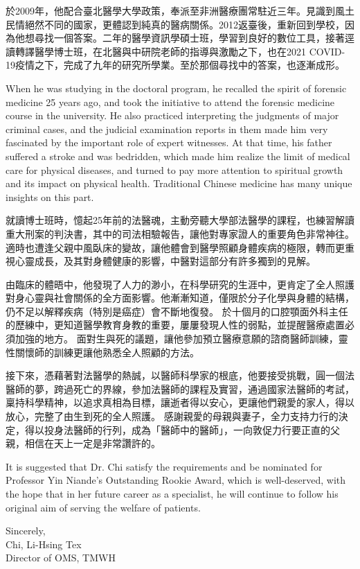 \documentclass{letter}
\begin{document}
\begin{letter}
於2009年，他配合臺北醫學大學政策，奉派至非洲醫療團常駐近三年。見識到風土民情絕然不同的國家，更體認到純真的醫病關係。2012返臺後，重新回到學校，因為他想尋找一個答案。二年的醫學資訊學碩士班，學習到良好的數位工具，接著逕讀轉譯醫學博士班，在北醫與中研院老師的指導與激勵之下，也在2021 COVID-19疫情之下，完成了九年的研究所學業。至於那個尋找中的答案，也逐漸成形。

When he was studying in the doctoral program, he recalled the spirit of forensic medicine 25 years ago, and took the initiative to attend the forensic medicine course in the university.
He also practiced interpreting the judgments of major criminal cases, and the judicial examination reports in them made him very fascinated by the important role of expert witnesses.
At that time, his father suffered a stroke and was bedridden, which made him realize the limit of medical care for physical diseases, and turned to pay more attention to spiritual growth and its impact on physical health. Traditional Chinese medicine has many unique insights on this part.

就讀博士班時，憶起25年前的法醫魂，主動旁聽大學部法醫學的課程，也練習解讀重大刑案的判決書，其中的司法相驗報告，讓他對專家證人的重要角色非常神往。
適時也遭逢父親中風臥床的變故，讓他體會到醫學照顧身體疾病的極限，轉而更重視心靈成長，及其對身體健康的影響，中醫對這部分有許多獨到的見解。

由臨床的體晤中，他發現了人力的渺小，在科學研究的生涯中，更肯定了全人照護對身心靈與社會關係的全方面影響。他漸漸知道，僅限於分子化學與身體的結構，仍不足以解釋疾病（特別是癌症）會不斷地復發。
於十個月的口腔顎面外科主任的歷練中，更知道醫學教育身教的重要，屢屢發現人性的弱點，並提醒醫療處置必須加強的地方。 %
面對生與死的議題，讓他參加預立醫療意願的諮商醫師訓練，靈性關懷師的訓練更讓他熟悉全人照顧的方法。

接下來，憑藉著對法醫學的熱誠，以醫師科學家的根底，他要接受挑戰，圓一個法醫師的夢，跨過死亡的界線，參加法醫師的課程及實習，通過國家法醫師的考試，稟持科學精神，以追求真相為目標，讓逝者得以安心，更讓他們親愛的家人，得以放心，完整了由生到死的全人照護。
感謝親愛的母親與妻子，全力支持力行的決定，得以投身法醫師的行列，成為「醫師中的醫師」，一向敦促力行要正直的父親，相信在天上一定是非常讚許的。


It is suggested that Dr. Chi satisfy the requirements and be nominated for Professor Yin Niande's Outstanding Rookie Award, which is well-deserved, with the hope that in her future career as a specialist, he will continue to follow his original aim of serving the welfare of patients.

\medskip
Sincerely, \\
Chi, Li-Hsing Tex \\
Director of OMS, TMWH

\clearpage

%


\end{letter}
\end{document}
